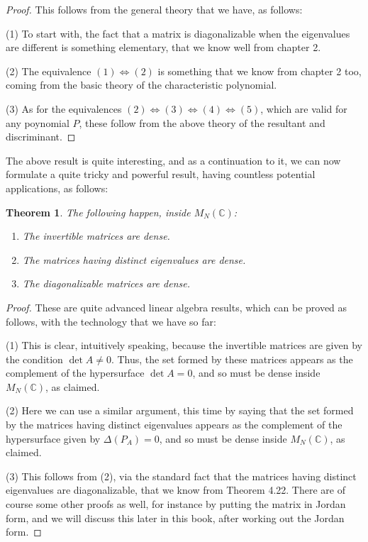 \documentclass[12pt]{amsbook}
\newtheorem{theorem}{Theorem}[chapter]
\begin{document}
\begin{proof}
This follows from the general theory that we have, as follows:

\medskip

(1) To start with, the fact that a matrix is diagonalizable when the eigenvalues are different is something elementary, that we know well from chapter 2.

\medskip

(2) The equivalence $(1)\iff(2)$ is something that we know from chapter 2 too, coming from the basic theory of the characteristic polynomial.

\medskip

(3) As for the equivalences $(2)\iff(3)\iff(4)\iff(5)$, which are valid for any poynomial $P$, these follow from the above theory of the resultant and discriminant.
\end{proof}

The above result is quite interesting, and as a continuation to it, we can now formulate a quite tricky and powerful result, having countless potential applications, as follows:


\begin{theorem}
The following happen, inside $M_N(\mathbb C)$:
\begin{enumerate}
\item The invertible matrices are dense.

\item The matrices having distinct eigenvalues are dense.

\item The diagonalizable matrices are dense.
\end{enumerate}
\end{theorem}

\begin{proof}
These are quite advanced linear algebra results, which can be proved as follows, with the technology that we have so far:

\medskip

(1) This is clear, intuitively speaking, because the invertible matrices are given by the condition $\det A\neq 0$. Thus, the set formed by these matrices appears as the complement of the hypersurface $\det A=0$, and so must be dense inside $M_N(\mathbb C)$, as claimed. 

\medskip

(2) Here we can use a similar argument, this time by saying that the set formed by the matrices having distinct eigenvalues appears as the complement of the hypersurface given by $\Delta(P_A)=0$, and so must be dense inside $M_N(\mathbb C)$, as claimed. 

\medskip

(3) This follows from (2), via the standard fact that the matrices having distinct eigenvalues are diagonalizable, that we know from Theorem 4.22. There are of course some other proofs as well, for instance by putting the matrix in Jordan form, and we will discuss this later in this book, after working out the Jordan form.
\end{proof}
\end{document}
